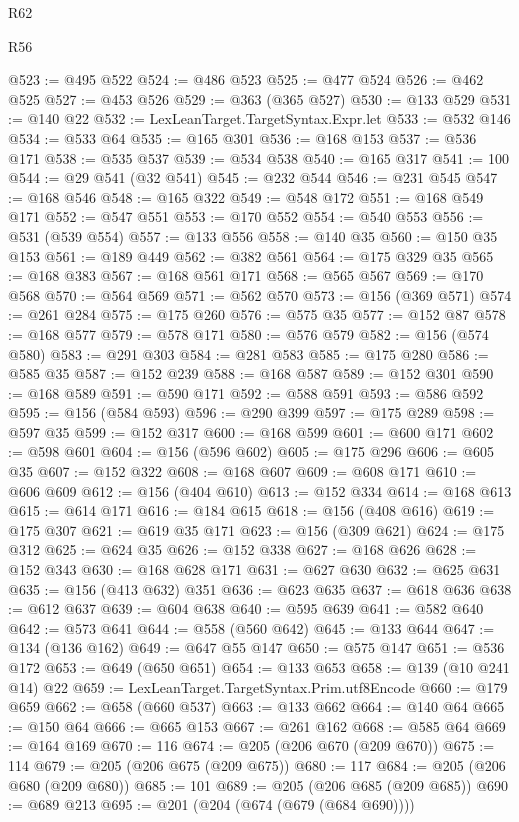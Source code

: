 \begin{lexlean}{R62}
\begin{lexlean}{R56}
\begin{coremodule}
{{{{{{{{{{{{{{{{{{{{{{{{{{{{{{{{{{{{{{{{{{{{{{{{{{{{{{{{{{{{{{{{{{{{{{{{{{{{{{{{{{{{{{{{{{{{{{{{{{{{{{{{{{{{{{{{{{{{{{{{{{{{{{{{{{{{{{{{{{{{{{{{{{{{{{{{{{{{{{{{{{{{{{{{{{{{{{{{{{{{{{{{{{{{{{{{{{{{{{{{{{{{{{{{{{{@523 := @495 @522
@524 := @486 @523
@525 := @477 @524
@526 := @462 @525
@527 := @453 @526
@529 := @363 (@365 @527)
@530 := @133 @529
@531 := @140 @22
@532 := LexLeanTarget.TargetSyntax.Expr.let
@533 := @532 @146
@534 := @533 @64
@535 := @165 @301
@536 := @168 @153
@537 := @536 @171
@538 := @535 @537
@539 := @534 @538
@540 := @165 @317
@541 := 100
@544 := @29 @541 (@32 @541)
@545 := @232 @544
@546 := @231 @545
@547 := @168 @546
@548 := @165 @322
@549 := @548 @172
@551 := @168 @549 @171
@552 := @547 @551
@553 := @170 @552
@554 := @540 @553
@556 := @531 (@539 @554)
@557 := @133 @556
@558 := @140 @35
@560 := @150 @35 @153
@561 := @189 @449
@562 := @382 @561
@564 := @175 @329 @35
@565 := @168 @383
@567 := @168 @561 @171
@568 := @565 @567
@569 := @170 @568
@570 := @564 @569
@571 := @562 @570
@573 := @156 (@369 @571)
@574 := @261 @284
@575 := @175 @260
@576 := @575 @35
@577 := @152 @87
@578 := @168 @577
@579 := @578 @171
@580 := @576 @579
@582 := @156 (@574 @580)
@583 := @291 @303
@584 := @281 @583
@585 := @175 @280
@586 := @585 @35
@587 := @152 @239
@588 := @168 @587
@589 := @152 @301
@590 := @168 @589
@591 := @590 @171
@592 := @588 @591
@593 := @586 @592
@595 := @156 (@584 @593)
@596 := @290 @399
@597 := @175 @289
@598 := @597 @35
@599 := @152 @317
@600 := @168 @599
@601 := @600 @171
@602 := @598 @601
@604 := @156 (@596 @602)
@605 := @175 @296
@606 := @605 @35
@607 := @152 @322
@608 := @168 @607
@609 := @608 @171
@610 := @606 @609
@612 := @156 (@404 @610)
@613 := @152 @334
@614 := @168 @613
@615 := @614 @171
@616 := @184 @615
@618 := @156 (@408 @616)
@619 := @175 @307
@621 := @619 @35 @171
@623 := @156 (@309 @621)
@624 := @175 @312
@625 := @624 @35
@626 := @152 @338
@627 := @168 @626
@628 := @152 @343
@630 := @168 @628 @171
@631 := @627 @630
@632 := @625 @631
@635 := @156 (@413 @632) @351
@636 := @623 @635
@637 := @618 @636
@638 := @612 @637
@639 := @604 @638
@640 := @595 @639
@641 := @582 @640
@642 := @573 @641
@644 := @558 (@560 @642)
@645 := @133 @644
@647 := @134 (@136 @162)
@649 := @647 @55 @147
@650 := @575 @147
@651 := @536 @172
@653 := @649 (@650 @651)
@654 := @133 @653
@658 := @139 (@10 @241 @14) @22
@659 := LexLeanTarget.TargetSyntax.Prim.utf8Encode
@660 := @179 @659
@662 := @658 (@660 @537)
@663 := @133 @662
@664 := @140 @64
@665 := @150 @64
@666 := @665 @153
@667 := @261 @162
@668 := @585 @64
@669 := @164 @169
@670 := 116
@674 := @205 (@206 @670 (@209 @670))
@675 := 114
@679 := @205 (@206 @675 (@209 @675))
@680 := 117
@684 := @205 (@206 @680 (@209 @680))
@685 := 101
@689 := @205 (@206 @685 (@209 @685))
@690 := @689 @213
@695 := @201 (@204 (@674 (@679 (@684 @690))))
}}}}}}}}}}}}}}}}}}}}}}}}}}}}}}}}}}}}}}}}}}}}}}}}}}}}}}}}}}}}}}}}}}}}}}}}}}}}}}}}}}}}}}}}}}}}}}}}}}}}}}}}}}}}}}}}}}}}}}}}}}}}}}}}}}}}}}}}}}}}}}}}}}}}}}}}}}}}}}}}}}}}}}}}}}}}}}}}}}}}}}}}}}}}}}}}}}}}}}}}}}}}}}}}}}}
\end{coremodule}
\end{lexlean}
\end{lexlean}

